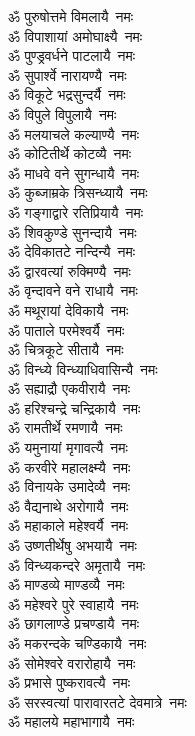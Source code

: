 \begin{multicols}{2}
\begin{flushleft}
ॐ पुरुषोत्तमे विमलायै~नमः\\
ॐ विपाशायां अमोघाक्ष्यै~नमः\\
ॐ पुण्ड्रवर्धने पाटलायै~नमः\\
ॐ सुपार्श्वे नारायण्यै~नमः\\
ॐ विकूटे भद्रसुन्दर्यै~नमः\hfill{}\\
ॐ विपुले विपुलायै~नमः\\
ॐ मलयाचले कल्याण्यै~नमः\\
ॐ कोटितीर्थे कोटव्यै~नमः\\
ॐ माधवे वने सुगन्धायै~नमः\\
ॐ कुब्जाम्रके त्रिसन्ध्यायै~नमः\\
ॐ गङ्गाद्वारे रतिप्रियायै~नमः\\
ॐ शिवकुण्डे सुनन्दायै~नमः\\
ॐ देविकातटे नन्दिन्यै~नमः\\
ॐ द्वारवत्यां रुक्मिण्यै~नमः\\
ॐ वृन्दावने वने राधायै~नमः\hfill{}\\
ॐ मथूरायां देविकायै~नमः\\
ॐ पाताले परमेश्वर्यै~नमः\\
ॐ चित्रकूटे सीतायै~नमः\\
ॐ विन्ध्ये विन्ध्याधिवासिन्यै~नमः\\
ॐ सह्याद्रौ एकवीरायै~नमः\\
ॐ हरिश्चन्द्रे चन्द्रिकायै~नमः\\
ॐ रामतीर्थे रमणायै~नमः\\
ॐ यमुनायां मृगावत्यै~नमः\\
ॐ करवीरे महालक्ष्म्यै~नमः\\
ॐ विनायके उमादेव्यै~नमः\hfill{}\\
ॐ वैद्यनाथे अरोगायै~नमः\\
ॐ महाकाले महेश्वर्यै~नमः\\
ॐ उष्णतीर्थेषु अभयायै~नमः\\
ॐ विन्ध्यकन्दरे अमृतायै~नमः\\
ॐ माण्डव्ये माण्डव्यै~नमः\\
ॐ महेश्वरे पुरे स्वाहायै~नमः\\
ॐ छागलाण्डे प्रचण्डायै~नमः\\
ॐ मकरन्दके चण्डिकायै~नमः\\
ॐ सोमेश्वरे वरारोहायै~नमः\\
ॐ प्रभासे पुष्करावत्यै~नमः\hfill{}\\
ॐ सरस्वत्यां पारावारतटे देवमात्रे~नमः\\
ॐ महालये महाभागायै~नमः\\

\end{flushleft}
\end{multicols}
